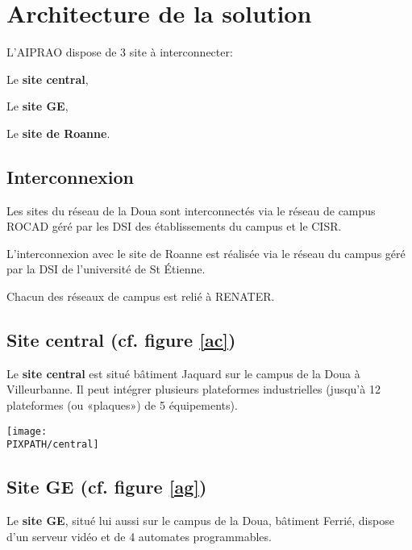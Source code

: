 \section{Architecture de la solution}

L'AIPRAO dispose de 3 site à interconnecter:
\begin{description}
\item Le {\bf site central},
\item Le {\bf site GE},
\item Le {\bf site de Roanne}.
\end{description}

\subsection{Interconnexion}

Les sites du réseau de la Doua sont interconnectés via le réseau de campus
ROCAD géré par les DSI des établissements du campus et le CISR.

L'interconnexion avec le site de Roanne est réalisée via le réseau du campus
géré par la DSI de l'université de St Étienne.

Chacun des réseaux de campus est relié à RENATER. 



\subsection{Site central (cf. figure \ref{ac})}

Le {\bf site central} est situé bâtiment Jaquard sur le campus
        de la Doua à Villeurbanne. Il peut intégrer plusieurs plateformes 
        industrielles (jusqu'à 12 plateformes (ou «plaques») de 5 équipements).

\begin{center}
\begin{sidewaysfigure}[!h]
    \texttt{[image: \\PIXPATH/central]}
    \caption{Architecture du site central}
    \label{ac}
\end{sidewaysfigure}
\end{center}

\subsection{Site GE (cf. figure \ref{ag})}

Le {\bf site GE}, situé lui aussi sur le campus de la Doua, bâtiment
        Ferrié, dispose d'un serveur vidéo et de 4 automates programmables.

